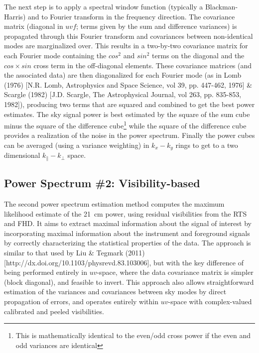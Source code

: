\documentclass[preprint2]{aastex}
\begin{document}
The next step is to apply a spectral window function (typically a Blackman-Harris) and to Fourier transform in the frequency direction. The covariance matrix (diagonal in $uvf$; terms given by the sum and difference variances) is propagated through this Fourier transform and covariances between non-identical modes are marginalized over. This results in a two-by-two covariance matrix for each Fourier mode containing the $cos^2$ and $sin^2$ terms on the diagonal and the $cos\times sin$ cross term in the off-diagonal elements. These covariance matrices (and the associated data) are then diagonalized for each Fourier mode (as in Lomb (1976) [N.R. Lomb, Astrophysics and Space Science, vol 39, pp. 447-462, 1976] \& Scargle (1982) [J.D. Scargle, The Astrophysical Journal, vol 263, pp. 835-853, 1982]), producing two terms that are squared and combined to get the best power estimates. The sky signal power is best estimated by the square of the sum cube minus the square of the difference cube\footnote{This is mathematically identical to the even/odd cross power if the even and odd variances are identical} while the square of the difference cube provides a realization of the noise in the power spectrum. Finally the power cubes can be averaged (using a variance weighting) in $k_x-k_y$ rings to get to a two dimensional $k_{\|}-k_{\bot}$ space.

\subsection{Power Spectrum \#2: Visibility-based}
\label{sec:CHIPS}
The second power spectrum estimation method computes the maximum likelihood estimate of the 21~cm power, using residual visibilities from the RTS and FHD. It aims to extract maximal information about the signal of interest by incorporating maximal information about the instrument and foreground signals by correctly characterizing the statistical properties of the data. The approach is similar to that used by Liu \& Tegmark (2011)[http://dx.doi.org/10.1103/physrevd.83.103006], but with the key difference of being performed entirely in $uv$-space, where the data covariance matrix is simpler (block diagonal), and feasible to invert. This approach also allows straightforward estimation of the variances and covariances between sky modes by direct propagation of errors, and operates entirely within $uv$-space with complex-valued calibrated and peeled visibilities.
\end{document}

